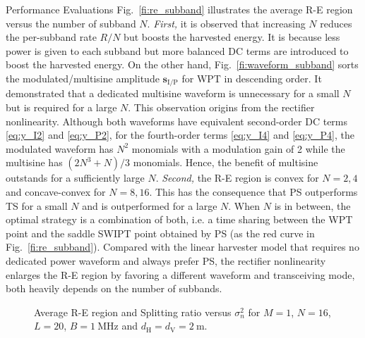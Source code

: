 \documentclass[journal]{IEEEtran}
\begin{document}
\begin{section}{Performance Evaluations}
		Fig.~\ref{fi:re_subband} illustrates the average R-E region versus the number of subband $N$. \emph{First,} it is observed that increasing $N$ reduces the per-subband rate $R/N$ but boosts the harvested energy. It is because less power is given to each subband but more balanced DC terms are introduced to boost the harvested energy. On the other hand, Fig.~\ref{fi:waveform_subband} sorts the modulated/multisine amplitude $\boldsymbol{s}_{\mathrm{I/P}}$ for WPT in descending order. It demonstrated that a dedicated multisine waveform is unnecessary for a small $N$ but is required for a large $N$. This observation origins from the rectifier nonlinearity. Although both waveforms have equivalent second-order DC terms \eqref{eq:y_I2} and \eqref{eq:y_P2}, for the fourth-order terms \eqref{eq:y_I4} and \eqref{eq:y_P4}, the modulated waveform has $N^2$ monomials with a modulation gain of \num{2} while the multisine has $(2N^3+N)/3$ monomials. Hence, the benefit of multisine outstands for a sufficiently large $N$. \emph{Second,} the R-E region is convex for $N=2,4$ and concave-convex for $N=8,16$. This has the consequence that PS outperforms TS for a small $N$ and is outperformed for a large $N$. When $N$ is in between, the optimal strategy is a combination of both, i.e. a time sharing between the WPT point and the saddle SWIPT point obtained by PS (as the red curve in Fig.~\ref{fi:re_subband}). Compared with the linear harvester model that requires no dedicated power waveform and always prefer PS, the rectifier nonlinearity enlarges the R-E region by favoring a different waveform and transceiving mode, both heavily depends on the number of subbands.

		\begin{figure}[!t]
			\centering
			\caption{Average R-E region and Splitting ratio versus $\sigma_n^2$ for $M=1$, $N=16$, $L=20$, $B=\SI{1}{\MHz}$ and $d_{\mathrm{H}}=d_{\mathrm{V}}=\SI{2}{\meter}$.}
		\end{figure}


\end{section}
\end{document}
